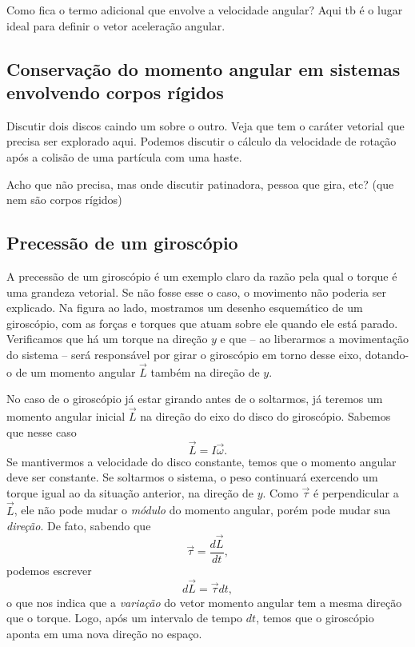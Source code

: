 Como fica o termo adicional que envolve a velocidade angular? Aqui tb é o lugar ideal para definir o vetor aceleração angular.

\subsection{Conservação do momento angular em sistemas envolvendo corpos rígidos}

Discutir dois discos caindo um sobre o outro. Veja que tem o caráter vetorial que precisa ser explorado aqui. Podemos discutir o cálculo da velocidade de rotação após a colisão de uma partícula com uma haste.

Acho que não precisa, mas onde discutir patinadora, pessoa que gira, etc? (que nem são corpos rígidos)

\subsection{Precessão de um giroscópio}


A precessão de um giroscópio é um exemplo claro da razão pela qual o torque é uma grandeza vetorial. Se não fosse esse o caso, o movimento não poderia ser explicado. Na figura ao lado, mostramos um desenho esquemático de um giroscópio, com as forças e torques que atuam sobre ele quando ele está parado. Verificamos que há um torque na direção $y$ e que -- ao liberarmos a movimentação do sistema -- será responsável por girar o giroscópio em torno desse eixo, dotando-o de um momento angular $\vec{L}$ também na direção de $y$.

No caso de o giroscópio já estar girando antes de o soltarmos, já teremos um momento angular inicial $\vec{L}$ na direção do eixo do disco do giroscópio. Sabemos que nesse caso 
\begin{equation}
  \vec{L} = I\vec{\omega}.
\end{equation}
%
Se mantivermos a velocidade do disco constante, temos que o momento angular deve ser constante. Se soltarmos o sistema, o peso continuará exercendo um torque igual ao da situação anterior, na direção de $y$. Como $\vec{\tau}$ é perpendicular a $\vec{L}$, ele não pode mudar o \emph{módulo} do momento angular, porém pode mudar sua \emph{direção}. De fato, sabendo que
\begin{equation}
  \vec{\tau} = \frac{d\vec{L}}{dt},
\end{equation}
%
podemos escrever
\begin{equation}
  d\vec{L} = \vec{\tau} dt,
\end{equation}
%
o que nos indica que a \emph{variação} do vetor momento angular tem a mesma direção que o torque. Logo, após um intervalo de tempo $dt$, temos que o giroscópio aponta em uma nova direção no espaço.

